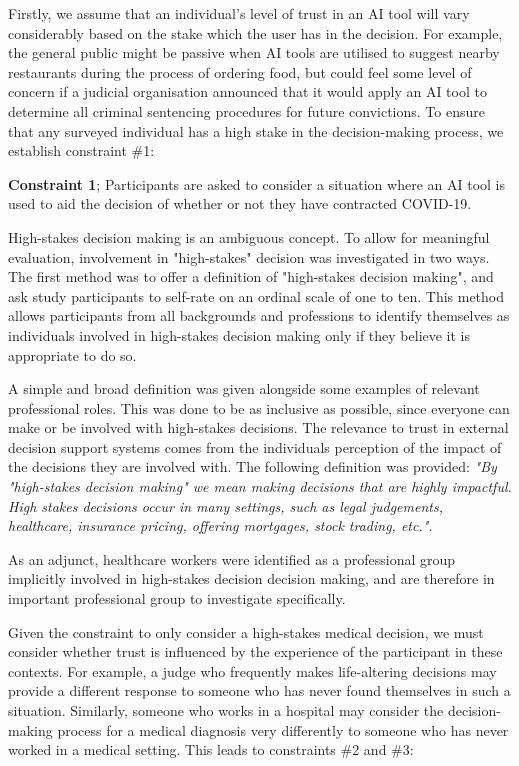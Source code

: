 \documentclass[manuscript,screen,review]{acmart}
\begin{document}
 Firstly, we assume that an individual's level of trust in an AI tool will vary considerably based on the stake which the user has in the decision. For example, the general public might be passive when AI tools are utilised to suggest nearby restaurants during the process of ordering food, but could feel some level of concern if a judicial organisation announced that it would apply an AI tool to determine all criminal sentencing procedures for future convictions. To ensure that any surveyed individual has a high stake in the decision-making process, we establish constraint \#1:
 \begin{center}
     \textbf{Constraint 1}; Participants are asked to consider a situation where an AI tool is used to aid the decision of whether or not they have contracted COVID-19.
 \end{center}

High-stakes decision making is an ambiguous concept. To allow for meaningful evaluation, involvement in "high-stakes" decision was investigated in two ways. \\

The first method was to offer a definition of "high-stakes decision making", and ask study participants to self-rate on an ordinal scale of one to ten. This method allows participants from all backgrounds and professions to identify themselves as individuals involved in high-stakes decision making only if they believe it is appropriate to do so. 

A simple and broad definition was given alongside some examples of relevant professional roles. This was done to be as inclusive as possible, since everyone can make or be involved with high-stakes decisions. The relevance to trust in external decision support systems comes from the individuals perception of the impact of the decisions they are involved with. The following definition was provided:
\textit{"By "high-stakes decision making" we mean making decisions that are highly impactful. High stakes decisions occur in many settings, such as legal judgements, healthcare, insurance pricing, offering mortgages, stock trading, etc.".}



As an adjunct, healthcare workers were identified as a professional group implicitly involved in high-stakes decision decision making, and are therefore in important professional group to investigate specifically.

Given the constraint to only consider a high-stakes medical decision, we must consider whether trust is influenced by the experience of the participant in these contexts. For example, a judge who frequently makes life-altering decisions may provide a different response to someone who has never found themselves in such a situation. Similarly, someone who works in a hospital may consider the decision-making process for a medical diagnosis very differently to someone who has never worked in a medical setting. This leads to constraints \#2 and \#3:
 
\end{document}
